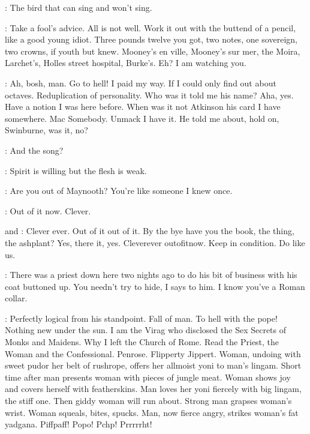 \Florry:
The bird that can sing and won't sing.


\PhilipSober:
Take a fool's advice.
All is not well.
Work it out with the buttend of a pencil, like a good young idiot.
Three pounds twelve you got, two notes,
one sovereign, two crowns, if youth but knew.
Mooney's en ville, Mooney's sur mer, the Moira, Larchet's,
Holles street hospital, Burke's.
Eh? I am watching you.%

\PhilipDrunk:
Ah, bosh, man.
Go to hell!
I paid my way.
If I could only find out about octaves.
Reduplication of personality.
Who was it told me his name?
Aha, yes.
Have a notion I was here before.
When was it not Atkinson his card I have somewhere.
Mac Somebody.
Unmack I have it.
He told me about, hold on, Swinburne, was it, no?

\Florry:
And the song?

\Stephen:
Spirit is willing but the flesh is weak.

\Florry:
Are you out of Maynooth?
You're like someone I knew once.

\Stephen:
Out of it now.
Clever.

\PhilipDrunk and \PhilipSober:
Clever ever.
Out of it out of it.
By the bye have you the book, the thing, the ashplant?
Yes, there it, yes.
Cleverever outofitnow.
Keep in condition.
Do like us.

\Zoe:
There was a priest down here two nights ago
to do his bit of business with his coat buttoned up.
You needn't try to hide, I says to him.
I know you've a Roman collar.

\Virag:
Perfectly logical from his standpoint.
Fall of man.
To hell with the pope!
Nothing new under the sun.
I am the Virag who disclosed the Sex Secrets of Monks and Maidens.
Why I left the Church of Rome.
Read the Priest, the Woman and the Confessional.
Penrose.
Flipperty Jippert.
Woman, undoing with sweet pudor her belt of rushrope,
offers her allmoist yoni to man's lingam.
Short time after man presents woman with pieces of jungle meat.
Woman shows joy and covers herself with featherskins.
Man loves her yoni fiercely with big lingam, the stiff one.
Then giddy woman will run about.
Strong man grapses woman's wrist.
Woman squeals, bites, spucks.
Man, now fierce angry, strikes woman's fat yadgana.
Piffpaff!
Popo!
Pchp!
Prrrrrht!

